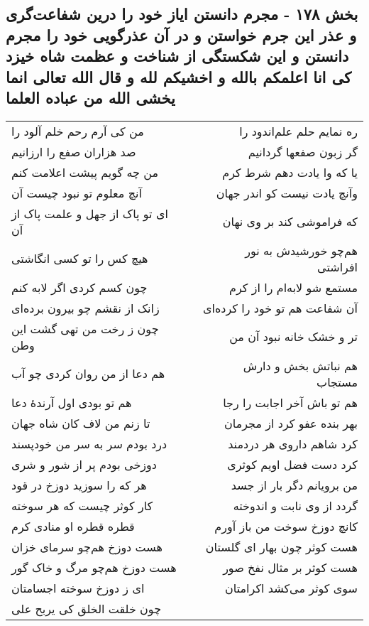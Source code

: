 \begin{center}
\section*{بخش ۱۷۸ - مجرم دانستن ایاز خود را درین شفاعت‌گری و عذر این جرم خواستن و در آن عذرگویی خود را مجرم دانستن و این شکستگی از شناخت و عظمت شاه خیزد کی انا اعلمکم بالله و اخشیکم لله و قال الله تعالی انما یخشی الله من عباده العلما}
\label{sec:sh178}
\begin{longtable}{l p{0.5cm} r}
من کی آرم رحم خلم آلود را
&&
ره نمایم حلم علم‌اندود را
\\
صد هزاران صفع را ارزانیم
&&
گر زبون صفعها گردانیم
\\
من چه گویم پیشت اعلامت کنم
&&
یا که وا یادت دهم شرط کرم
\\
آنچ معلوم تو نبود چیست آن
&&
وآنچ یادت نیست کو اندر جهان
\\
ای تو پاک از جهل و علمت پاک از آن
&&
که فراموشی کند بر وی نهان
\\
هیچ کس را تو کسی انگاشتی
&&
هم‌چو خورشیدش به نور افراشتی
\\
چون کسم کردی اگر لابه کنم
&&
مستمع شو لابه‌ام را از کرم
\\
زانک از نقشم چو بیرون برده‌ای
&&
آن شفاعت هم تو خود را کرده‌ای
\\
چون ز رخت من تهی گشت این وطن
&&
تر و خشک خانه نبود آن من
\\
هم دعا از من روان کردی چو آب
&&
هم نباتش بخش و دارش مستجاب
\\
هم تو بودی اول آرندهٔ دعا
&&
هم تو باش آخر اجابت را رجا
\\
تا زنم من لاف کان شاه جهان
&&
بهر بنده عفو کرد از مجرمان
\\
درد بودم سر به سر من خودپسند
&&
کرد شاهم داروی هر دردمند
\\
دوزخی بودم پر از شور و شری
&&
کرد دست فضل اویم کوثری
\\
هر که را سوزید دوزخ در قود
&&
من برویانم دگر بار از جسد
\\
کار کوثر چیست که هر سوخته
&&
گردد از وی نابت و اندوخته
\\
قطره قطره او منادی کرم
&&
کانچ دوزخ سوخت من باز آورم
\\
هست دوزخ هم‌چو سرمای خزان
&&
هست کوثر چون بهار ای گلستان
\\
هست دوزخ هم‌چو مرگ و خاک گور
&&
هست کوثر بر مثال نفخ صور
\\
ای ز دوزخ سوخته اجسامتان
&&
سوی کوثر می‌کشد اکرامتان
\\
چون خلقت الخلق کی یربح علی

\end{longtable}
\end{center}
